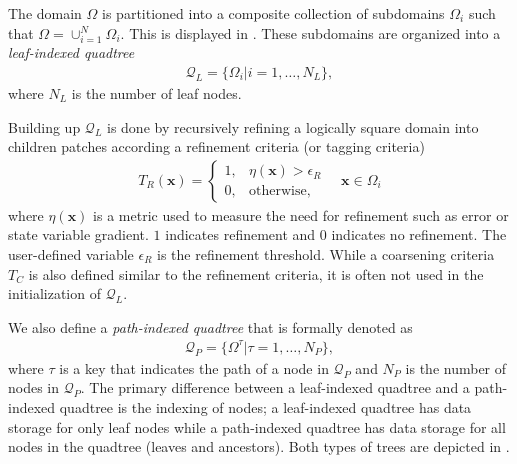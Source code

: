 The domain $\Omega$ is partitioned into a composite collection of subdomains $\Omega_i$ such that $\Omega = \cup_{i = 1}^{N} \Omega_i$. This is displayed in . These subdomains are organized into a {\em leaf-indexed quadtree}
\begin{align}
    \mathcal{Q}_L = \{\Omega_i | i = 1, \dots, N_L\},
    \label{eq:leaf-indexed-quadtree}
\end{align}
where $N_L$ is the number of leaf nodes.  Building up $\mathcal{Q}_L$ is done by recursively refining a logically square domain into children patches according a refinement criteria (or tagging criteria)
\begin{align}
    T_{R} (\textbf{x}) =
    \begin{cases}
        1,& \eta(\textbf{x}) > \epsilon_{R} \\
        0,& \text{otherwise},
    \end{cases}
    \quad \textbf{x} \in \Omega_i
\end{align}
where $\eta(\textbf{x})$ is a metric used to measure the need for refinement such as error or state variable gradient. $1$ indicates refinement and $0$ indicates no refinement. The user-defined variable $\epsilon_{R}$ is the refinement threshold. While a coarsening criteria $T_{C}$ is also defined similar to the refinement criteria, it is often not used in the initialization of $\mathcal{Q}_L$.

We also define a {\em path-indexed quadtree} that is formally denoted as
\begin{align}
    \mathcal{Q}_P = \{\Omega^{\tau} | \tau = 1, \dots, N_P\},
    \label{eq:path-indexed-quadtree}
\end{align}
where $\tau$ is a key that indicates the path of a node in $\mathcal{Q}_P$ and $N_P$ is the number of nodes in $\mathcal{Q}_P$. The primary difference between a leaf-indexed quadtree and a path-indexed quadtree is the indexing of nodes; a leaf-indexed quadtree has data storage for only leaf nodes while a path-indexed quadtree has data storage for all nodes in the quadtree (leaves and ancestors). Both types of trees are depicted in .

